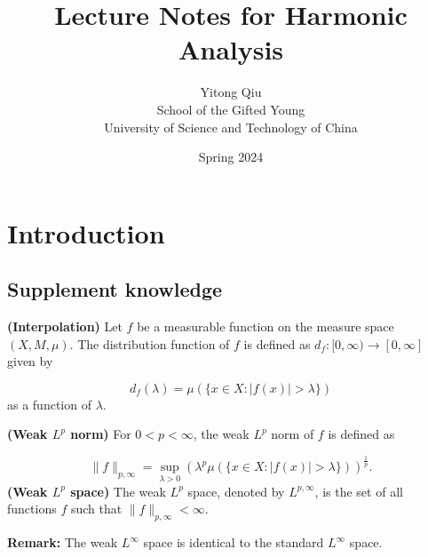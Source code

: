 \documentclass[12pt,openany]{book}
\title{Lecture Notes for Harmonic Analysis}
\author{Yitong Qiu\\
School of the Gifted Young\\
University of Science and Technology of China}
\date{Spring 2024}
\theoremstyle{definition}
\begin{document}
\maketitle
\tableofcontents
\setcounter{page}{0}
\newpage

\chapter{Introduction}
\section{Supplement knowledge}
\noindent\textbf{(Interpolation)} Let $f$ be a measurable function on the measure space $(X, M, \mu)$. The distribution function of $f$ is defined as $d_f: [0, \infty) \rightarrow [0, \infty]$ given by

$$d_f(\lambda) = \mu(\{x \in X: |f(x)| > \lambda\})$$as a function of $\lambda$.

\noindent\textbf{(Weak $L^p$ norm)} For $0 < p < \infty$, the weak $L^p$ norm of $f$ is defined as

$$\|f\|_{p, \infty} = \sup_{\lambda > 0} \left(\lambda^p \mu(\{x \in X: |f(x)| > \lambda\})\right)^{\frac{1}{p}}.
$$
\noindent\textbf{(Weak $L^p$ space)} The weak $L^p$ space, denoted by $L^{p, \infty}$, is the set of all functions $f$ such that $\|f\|_{p, \infty} < \infty$.

\noindent\textbf{Remark:} The weak $L^{\infty}$ space is identical to the standard $L^{\infty}$ space.
\end{document}
